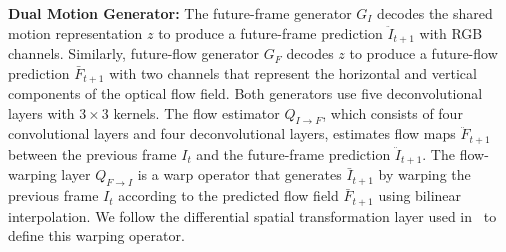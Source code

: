\documentclass[10pt,twocolumn,letterpaper]{article}
\begin{document}
	
	\textbf{Dual Motion Generator:}
	The future-frame generator $G_I$ decodes the shared motion representation $z$ to produce a future-frame prediction $\ddot{I}_{t+1}$ with RGB channels. Similarly, future-flow generator $G_F$ decodes $z$ to produce a future-flow prediction $\bar{F}_{t+1}$ with two channels that represent the horizontal and vertical components of the optical flow field. Both generators use five deconvolutional layers with $3 \times 3$ kernels. The flow estimator $Q_{I\rightarrow F}$, which consists of four convolutional layers and four deconvolutional layers, estimates flow maps $\ddot{F}_{t+1}$ between the previous frame $I_t$ and the future-frame prediction $\ddot{I}_{t+1}$. The flow-warping layer $Q_{F\rightarrow I}$ is a warp operator that generates $\bar{I}_{t+1}$ by warping the previous frame $I_t$ according to the predicted flow field $\bar{F}_{t+1}$ using bilinear interpolation. We follow the differential spatial transformation layer used in~\cite{ranjan2016optical,jaderberg2015spatial} to define this warping operator.
	
\end{document}

